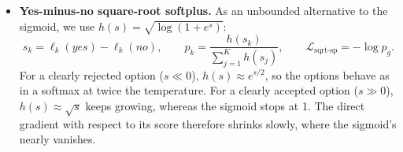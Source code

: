 \begin{itemize}
  \item \textbf{Yes-minus-no square-root softplus.}
    As an unbounded alternative to the sigmoid, we use
    $h(s)=\sqrt{\log(1+e^s)}$:
    \begin{equation}
      s_k=\ell_k(\textit{yes})-\ell_k(\textit{no}),\qquad
      p_k=\frac{h(s_k)}{\sum_{j=1}^{K}h(s_j)},\qquad
      \mathcal{L}_{\text{sqrt-sp}}=-\log p_g.
    \end{equation}
    For a clearly rejected option ($s\ll0$), $h(s)\approx e^{s/2}$, so the options behave as in a softmax at twice the temperature.
    For a clearly accepted option ($s\gg0$), $h(s)\approx\sqrt{s}$ keeps growing, whereas the sigmoid stops at 1.
    The direct gradient with respect to its score therefore shrinks slowly, where the sigmoid's nearly vanishes.
\end{itemize}
